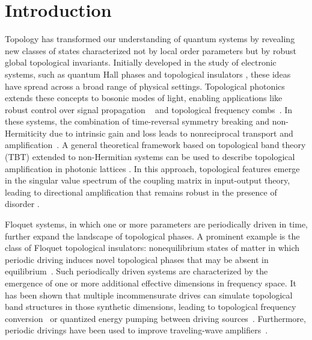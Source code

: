 \documentclass[a4paper,twocolumn,floatfix,10pt,superscriptaddress]%
{quantumarticle}
\begin{document}
\maketitle

\section{Introduction}
Topology has transformed our understanding of quantum systems by revealing new classes of states characterized not by local order parameters but by robust global topological invariants. Initially developed in the study of electronic systems, such as quantum Hall phases and topological insulators \cite{Hasan2010,Qi2011}, these ideas have spread across a broad range of physical settings. Topological photonics ~\cite{Lu2014,Ozawa2019,Mehrabad23} extends these concepts to bosonic modes of light, enabling applications like robust control over signal propagation ~\cite{Barik2018} and topological frequency combs~\cite{Flower2024}. In these systems, the combination of time-reversal symmetry breaking and non-Hermiticity due to intrinsic gain and loss leads to nonreciprocal transport and amplification~\cite{Metelmann15,Fang2017,peano2016,McDonald2022, delPino2022,Busnaina2024, Slim2024,Ramos2022}. A general theoretical framework based on topological band theory (TBT) extended to non-Hermitian systems \cite{Esaki2011,Gong2018} can be used to describe topological amplification in photonic lattices \cite{Porras2019,wanjura2020topological}.
In this approach, topological features emerge in the singular value spectrum of the coupling matrix in input-output theory, leading to directional amplification that remains robust in the presence of disorder 
\cite{Ramos2021, Wanjura2021,Gomez2022, GomezLeon2023, ClaveroRubio2025}. 

Floquet systems, in which one or more parameters are periodically driven in time, further expand the landscape of topological phases. A prominent example is the class of Floquet topological insulators: nonequilibrium states of matter in which periodic driving induces novel topological phases that may be absent in equilibrium~\cite{Lindner2011,Rechtsman2013,GomezLeon2013,Baum2018}. Such periodically driven systems are characterized by the emergence of one or more additional effective dimensions in frequency space. It has been shown that multiple incommensurate drives can simulate topological band structures in those synthetic dimensions, leading to topological frequency conversion~\cite{Martin2017} or quantized energy pumping between driving sources~\cite{Luneau2022}. Furthermore, periodic drivings have been used to improve traveling-wave amplifiers~\cite{Peng2022}.
\end{document}
